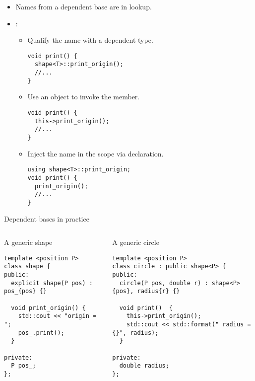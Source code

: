 \begin{frame}[t,fragile]{}
\begin{itemize}
  \item Names from a dependent base are  in lookup.

  \item {}:
    \begin{itemize}

      \item Qualify the name with a dependent type.
\begin{lstlisting}
void print() {
  shape<T>::print_origin();
  //...
}
\end{lstlisting}

      \item Use an object to invoke the member.
\begin{lstlisting}
void print() {
  this->print_origin();
  //...
}
\end{lstlisting}

      \item Inject the name in the scope via  declaration.
\begin{lstlisting}
using shape<T>::print_origin;
void print() {
  print_origin();
  //...
}
\end{lstlisting}
    \end{itemize}
\end{itemize}
\end{frame}

\begin{frame}[t,fragile]{Dependent bases in practice}
\begin{columns}[T]

\begin{block}{A generic shape}
\begin{lstlisting}
template <position P>
class shape {
public:
  explicit shape(P pos) : pos_{pos} {}

  void print_origin() {
    std::cout << "origin = ";
    pos_.print();
  }

private:
  P pos_;
};
\end{lstlisting}
\end{block}

\begin{block}{A generic circle}
\begin{lstlisting}
template <position P>
class circle : public shape<P> {
public:
  circle(P pos, double r) : shape<P>{pos}, radius{r} {}

  void print()  {
    this->print_origin();
    std::cout << std::format(" radius = {}", radius);
  }

private:
  double radius;
};
\end{lstlisting}
\end{block}

\end{columns}
\end{frame}
